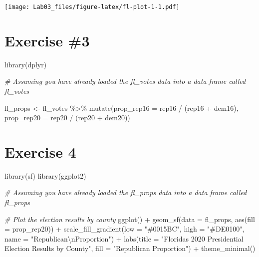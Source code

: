 \documentclass[
]{article}
\newenvironment{Shaded}{\begin{snugshade}}{\end{snugshade}}
\newcommand{\AttributeTok}[1]{\textcolor[rgb]{0.77,0.63,0.00}{#1}}
\newcommand{\CommentTok}[1]{\textcolor[rgb]{0.56,0.35,0.01}{\textit{#1}}}
\newcommand{\FunctionTok}[1]{\textcolor[rgb]{0.00,0.00,0.00}{#1}}
\newcommand{\NormalTok}[1]{#1}
\newcommand{\OtherTok}[1]{\textcolor[rgb]{0.56,0.35,0.01}{#1}}
\newcommand{\SpecialCharTok}[1]{\textcolor[rgb]{0.00,0.00,0.00}{#1}}
\newcommand{\StringTok}[1]{\textcolor[rgb]{0.31,0.60,0.02}{#1}}
\begin{document}
\texttt{[image: Lab03\_files/figure-latex/fl-plot-1-1.pdf]}

\hypertarget{exercise-3}{%
\section{Exercise \#3}\label{exercise-3}}

\begin{Shaded}
\begin{Highlighting}[]
\FunctionTok{library}\NormalTok{(dplyr)}

\CommentTok{\# Assuming you have already loaded the fl\_votes data into a data frame called \textquotesingle{}fl\_votes\textquotesingle{}}

\NormalTok{fl\_props }\OtherTok{\textless{}{-}}\NormalTok{ fl\_votes }\SpecialCharTok{\%\textgreater{}\%}
  \FunctionTok{mutate}\NormalTok{(}\AttributeTok{prop\_rep16 =}\NormalTok{ rep16 }\SpecialCharTok{/}\NormalTok{ (rep16 }\SpecialCharTok{+}\NormalTok{ dem16),}
         \AttributeTok{prop\_rep20 =}\NormalTok{ rep20 }\SpecialCharTok{/}\NormalTok{ (rep20 }\SpecialCharTok{+}\NormalTok{ dem20))}
\end{Highlighting}
\end{Shaded}

\hypertarget{exercise-4}{%
\section{Exercise 4}\label{exercise-4}}

\begin{Shaded}
\begin{Highlighting}[]
\FunctionTok{library}\NormalTok{(sf)}
\FunctionTok{library}\NormalTok{(ggplot2)}

\CommentTok{\# Assuming you have already loaded the fl\_props data into a data frame called \textquotesingle{}fl\_props\textquotesingle{}}

\CommentTok{\# Plot the election results by county}
\FunctionTok{ggplot}\NormalTok{() }\SpecialCharTok{+}
  \FunctionTok{geom\_sf}\NormalTok{(}\AttributeTok{data =}\NormalTok{ fl\_props, }\FunctionTok{aes}\NormalTok{(}\AttributeTok{fill =}\NormalTok{ prop\_rep20)) }\SpecialCharTok{+}
  \FunctionTok{scale\_fill\_gradient}\NormalTok{(}\AttributeTok{low =} \StringTok{"\#0015BC"}\NormalTok{, }\AttributeTok{high =} \StringTok{"\#DE0100"}\NormalTok{, }\AttributeTok{name =} \StringTok{"Republican}\SpecialCharTok{\textbackslash{}n}\StringTok{Proportion"}\NormalTok{) }\SpecialCharTok{+}
  \FunctionTok{labs}\NormalTok{(}\AttributeTok{title =} \StringTok{"Florida\textquotesingle{}s 2020 Presidential Election Results by County"}\NormalTok{,}
       \AttributeTok{fill =} \StringTok{"Republican Proportion"}\NormalTok{) }\SpecialCharTok{+}
  \FunctionTok{theme\_minimal}\NormalTok{()}
\end{Highlighting}
\end{Shaded}
\end{document}
